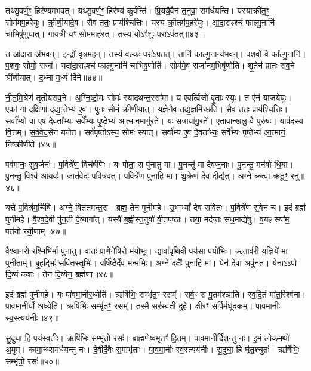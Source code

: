 तथ्सु॒वर्ण॒ꣳ॒ हिर॑ण्यमभवत्।
यथ्सु॒वर्ण॒ꣳ॒ हिर॑ण्यं कु॒र्वन्ति॑।
प्रि॒ययै॒वैनं॑ त॒नुवा॒ सम॑र्धयन्ति।
यस्याक्री॑त॒ꣳ॒ सोम॑मप॒हरे॑युः।
क्री॒णी॒यादे॒व।
सैव ततः॒ प्राय॑श्चित्तिः।
यस्य॑ क्री॒तम॑प॒हरे॑युः।
आ॒दा॒राꣴश्च॑ फाल्गु॒नानि॑ चा॒भिषु॑णुयात्।
गा॒य॒त्री यꣳ सोम॒माह॑रत्।
तस्य॒ योऽꣳ॑शुः प॒रा\-ऽप॑तत्॥४३॥

त आ॑दा॒रा अ॑भवन्।
इन्द्रो॑ वृ॒त्रम॑हन्।
तस्य॑ व॒ल्कः परा॑\-ऽपतत्।
तानि॑ फाल्गु॒नान्य॑भवन्।
प॒शवो॒ वै फा᳚ल्गु॒नानि॑।
प॒शवः॒ सोमो॒ राजा᳚।
यदा॑दा॒राꣴश्च॑ फाल्गु॒नानि॑ चाभिषु॒णोति॑।
सोम॑मे॒व राजा॑नम॒भिषु॑णोति।
शृ॒तेन॑ प्रातः सव॒ने श्री॑णीयात्।
द॒ध्ना म॒ध्यं दि॑ने॥४४॥

नी॒त॒मि॒श्रेण॑ तृतीयसव॒ने।
अ॒ग्नि॒ष्टो॒मः सोमः॑ स्याद्रथन्त॒र\-सा॑मा।
य ए॒वर्त्विजो॑ वृ॒ताः स्युः।
त ए॑नं याजयेयुः।
एकां॒ गां दक्षि॑णां दद्या॒त्तेभ्य॑ ए॒व।
पुनः॒ सोमं॑ क्रीणीयात्।
य॒ज्ञेनै॒व तद्य॒ज्ञमि॑च्छति।
सैव ततः॒ प्राय॑श्चित्तिः।
सर्वा᳚भ्यो॒ वा ए॒ष दे॒वता᳚भ्यः॒ सर्वे᳚भ्यः पृ॒ष्ठेभ्य॑ आ॒त्मान॒मागु॑रते।
यः स॒त्राया॑गु॒रते᳚।
ए॒तावा॒न्खलु॒ वै पुरु॑षः।
याव॑दस्य वि॒त्तम्।
स॒र्व॒वे॒द॒सेन॑ यजेत।
सर्व॑पृष्ठो\-ऽस्य॒ सोमः॑ स्यात्।
सर्वा᳚भ्य ए॒व दे॒वता᳚भ्यः॒ सर्वे᳚भ्यः पृ॒ष्ठेभ्य॑ आ॒त्मानं॒ निष्क्री॑णीते॥४५॥\anuvakamend[उ॒द्वाय॑ति मन्थेन्मन्थत्यक्रामत्प॒रा\-ऽप॑तन्म॒ध्यन्दि॑न आगु॒रते॒ पञ्च॑ च]

पव॑मानः॒ सुव॒र्जनः॑।
प॒वित्रे॑ण॒ विच॑र्\mbox{}षणिः।
यः पोता॒ स पु॑नातु मा।
पु॒नन्तु॑ मा देवज॒नाः।
पु॒नन्तु॒ मन॑वो धि॒या।
पु॒नन्तु॒ विश्व॑ आ॒यवः॑।
जात॑वेदः प॒वित्र॑वत्।
प॒वित्रे॑ण पुनाहि मा।
शु॒क्रेण॑ देव॒ दीद्य॑त्।
अग्ने॒ क्रत्वा॒ क्रतू॒ꣳ॒ रनु॑\-॥४६॥

यत्ते॑ प॒वित्र॑म॒र्चिषि॑।
अग्ने॒ वित॑तमन्त॒रा।
ब्रह्म॒ तेन॑ पुनीमहे।
उ॒भाभ्यां᳚ देव सवितः।
प॒वित्रे॑ण स॒वेन॑ च।
इ॒दं ब्रह्म॑ पुनीमहे।
वै॒श्व॒दे॒वी पु॑न॒ती दे॒व्यागा᳚त्।
यस्यै॑ ब॒ह्वीस्त॒नुवो॑ वी॒तपृ॑ष्ठाः।
तया॒ मद॑न्तः सध॒माद्ये॑षु।
व॒यꣴ स्या॑म॒ पत॑यो रयी॒णाम्॥४७॥

वै॒श्वा॒न॒रो र॒श्मिभि॑र्मा पुनातु।
वातः॑ प्रा॒णेने॑षि॒रो म॑यो॒भूः।
द्यावा॑पृथि॒वी पय॑सा॒ पयो॑भिः।
ऋ॒ताव॑री य॒ज्ञिये॑ मा पुनीताम्।
बृ॒हद्भिः॑ सवित॒स्तृभिः॑।
वर्\mbox{}षि॑ष्ठैर्देव॒ मन्म॑भिः।
अग्ने॒ दक्षैः᳚ पुनाहि मा।
येन॑ दे॒वा अपु॑नत।
येनाऽऽपो॑ दि॒व्यं कशः॑।
तेन॑ दि॒व्येन॒ ब्रह्म॑णा॥४८॥

इ॒दं ब्रह्म॑ पुनीमहे।
यः पा॑वमा॒नीर॒ध्येति॑।
ऋषि॑भिः॒ सम्भृ॑त॒ꣳ॒ रसम्᳚।
सर्व॒ꣳ॒ स पू॒तम॑श्ञाति।
स्व॒दि॒तं मा॑त॒रिश्व॑ना।
पा॒व॒मा॒नीर्यो अ॒ध्येति॑।
ऋषि॑भिः॒ सम्भृ॑त॒ꣳ॒ रसम्᳚।
तस्मै॒ सर॑स्वती दुहे।
क्षी॒रꣳ स॒र्पिर्मधू॑द॒कम्।
पा॒व॒मा॒नीः स्व॒स्त्यय॑नीः॥४९॥

सु॒दुघा॒ हि पय॑स्वतीः।
ऋषि॑भिः॒ सम्भृ॑तो॒ रसः॑।
ब्रा॒ह्म॒णेष्व॒मृतꣳ॑ हि॒तम्।
पा॒व॒मा॒नीर्दि॑शन्तु नः।
इ॒मं लो॒कमथो॑ अ॒मुम्।
कामा॒न्थ्सम॑र्धयन्तु नः।
दे॒वीर्दे॒वैः स॒माभृ॑ताः।
पा॒व॒मा॒नीः स्व॒स्त्यय॑नीः।
सु॒दुघा॒ हि घृ॑त॒श्चुतः॑।
ऋषि॑भिः॒ सम्भृ॑तो॒ रसः॑॥५०॥


